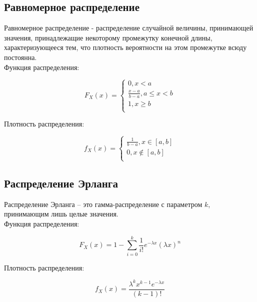 \documentclass[a4paper, 14pt]{article}
\begin{document}
\subsection*{Равномерное распределение}
	
Равномерное распределение - распределение случайной величины, принимающей значения, принадлежащие некоторому промежутку конечной длины, характеризующееся тем, что плотность вероятности на этом промежутке всюду постоянна.\\

Функция распределения:

\begin{equation*}
F_X (x) =
    \begin{cases}
        0, x < a \\
        \frac{x - a}{b - a}, a \le x < b \\
        1, x \geq b \\
    \end{cases}
\end{equation*}
	
Плотность распределения:

\begin{equation*}
    f_X (x) =
    \begin{cases}
        \frac{1}{b-a}, x \in [a,b] \\
        0, x \notin [a, b] \\
    \end{cases}
\end{equation*}

\newpage

\subsection*{Распределение Эрланга}

Распределение Эрланга – это гамма-распределение  с параметром $k$, принимающим лишь целые значения. \\

Функция распределения:

\begin{equation*}
F_X(x) = 1 - \sum_{i=0}^k  \frac{1}{i!} e^{-\lambda x} (\lambda x)^n
\end{equation*}
	
Плотность распределения:

\begin{equation*}
f_X(x) = \frac{\lambda^k x^{k-1} e^{-\lambda x} } {(k-1)!}
\end{equation*}
\end{document}
